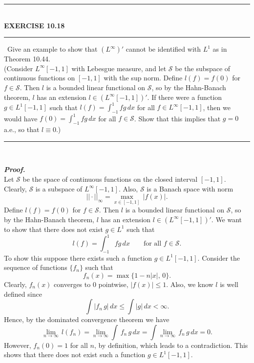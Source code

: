 \documentclass[a4paper,11pt]{article}
\begin{document}
	\begin{flushleft}
		\rule[-0.5ex]{17cm}{2pt}\\
			\textbf{EXERCISE 10.18}\\
		\rule[1.5ex]{17cm}{0.5pt}\
			Give an example to show that $(L^\infty)'$ cannot be identified with $L^1$ as in Theorem 10.44.\\

			(Consider $L^\infty [-1,1]$ with Lebesgue measure, and let $\mathscr{S}$ be the subspace of continuous functions on $[-1,1]$ with the sup norm. Define $l(f) = f(0)$ for $f \in \mathscr{S}$. Then $l$ is a bounded linear functional on $\mathscr{S}$, so by the Hahn-Banach theorem, $l$ has an extension $l \in (L^\infty[-1,1])'$. If there were a function $g \in L^1[-1,1]$ such that $l(f) = \int_{-1}^{1} fg\,dx$ for all $f \in L^\infty[-1,1]$, then we would have $f(0) = \int_{-1}^{1} fg\,dx$ for all $f \in \mathscr{S}$. Show that this implies that $g = 0$ a.e., so that $l \equiv 0$.)

		\rule[1.0ex]{17cm}{0.5pt}\
	\end{flushleft}
	\textit{\textbf {Proof.}}\\
		Let $\mathscr{S}$ be the space of continuous functions on the closed interval $[-1,1]$. Clearly, $\mathscr{S}$ is a subspace of $L^\infty[-1,1]$. Also, $\mathscr{S}$ is a Banach space with norm
			$$||\cdot||_\infty
			= \underset{x \in [-1,1]}{\max} \,|f(x)|.$$
		Define $l(f) = f(0)$ for $f \in \mathscr{S}$. Then $l$ is a bounded linear functional on $\mathscr{S}$, so by the Hahn-Banach theorem, $l$ has an extension $l \in (L^\infty[-1,1])'$. We want to show that there does not exist $g \in L^1$ such that
			$$l(f) = \int_{-1}^{1} fg \,dx
			\quad \quad \text{for all } f \in \mathscr{S}.$$
		To show this suppose there exists such a function $g \in L^1[-1,1]$. Consider the sequence of functions $\{f_n\}$ such that
			$$f_n(x) = \max\{1-n|x|,\,0\}.$$
		Clearly, $f_n(x)$ converges to 0 pointwise, $|f(x)| \leq 1$. Also, we know $l$ is well defined since
			$$\int|f_n\,g|\,dx \leq \int|g|\,dx < \infty.$$
		Hence, by the dominated convergence theorem we have
			$$\underset{n \to \infty}{\lim}\,l(f_n)
			= \underset{n \to \infty}{\lim} \int \,f_n\,g\,dx
			= \int \underset{n \to \infty}{\lim}\,f_n\,g\,dx
			= 0.$$
		However, $f_n(0) = 1$ for all $n$, by definition, which leads to a contradiction. This shows that there does not exist such a function $g \in L^1[-1,1]$.\\
\end{document}
